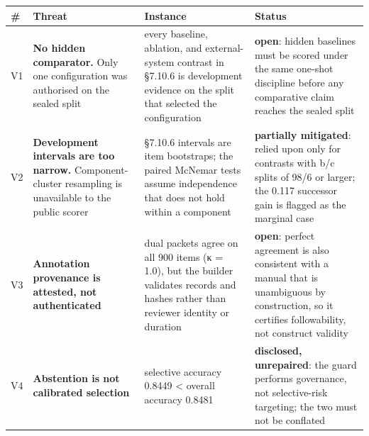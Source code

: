 {\def\LTcaptype{none} %
\begin{longtable}[]{@{}
  >{\raggedright\arraybackslash}p{}
  >{\raggedright\arraybackslash}p{}
  >{\raggedright\arraybackslash}p{}
  >{\raggedright\arraybackslash}p{}@{}}
\toprule\noalign{}
\begin{minipage}[b]{\linewidth}\raggedright
\#
\end{minipage} & \begin{minipage}[b]{\linewidth}\raggedright
Threat
\end{minipage} & \begin{minipage}[b]{\linewidth}\raggedright
Instance
\end{minipage} & \begin{minipage}[b]{\linewidth}\raggedright
Status
\end{minipage} \\
\midrule\noalign{}
\endhead
\bottomrule\noalign{}
\endlastfoot
V1 & \textbf{No hidden comparator.} Only one configuration was
authorised on the sealed split & every baseline, ablation, and
external-system contrast in §7.10.6 is development evidence on the split
that selected the configuration & \textbf{open}: hidden baselines must
be scored under the same one-shot discipline before any comparative
claim reaches the sealed split \\
V2 & \textbf{Development intervals are too narrow.} Component-cluster
resampling is unavailable to the public scorer & §7.10.6 intervals are
item bootstraps; the paired McNemar tests assume independence that does
not hold within a component & \textbf{partially mitigated}: relied upon
only for contrasts with b/c splits of 98/6 or larger; the 0.117
successor gain is flagged as the marginal case \\
V3 & \textbf{Annotation provenance is attested, not authenticated} &
dual packets agree on all 900 items (κ = 1.0), but the builder validates
records and hashes rather than reviewer identity or duration &
\textbf{open}: perfect agreement is also consistent with a manual that
is unambiguous by construction, so it certifies followability, not
construct validity \\
V4 & \textbf{Abstention is not calibrated selection} & selective
accuracy 0.8449 \textless{} overall accuracy 0.8481 & \textbf{disclosed,
unrepaired}: the guard performs governance, not selective-risk
targeting; the two must not be conflated \\

\end{longtable}}
